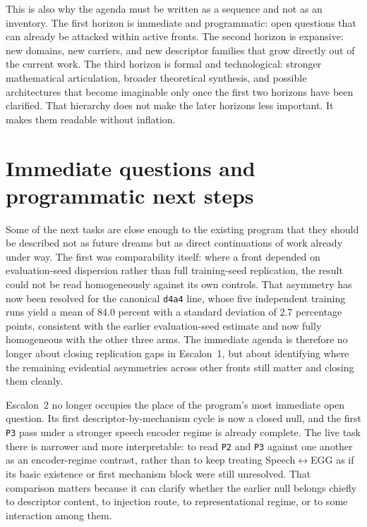 This is also why the agenda must be written as a sequence and not as an inventory. The first horizon is immediate and programmatic: open questions that can already be attacked within active fronts. The second horizon is expansive: new domains, new carriers, and new descriptor families that grow directly out of the current work. The third horizon is formal and technological: stronger mathematical articulation, broader theoretical synthesis, and possible architectures that become imaginable only once the first two horizons have been clarified. That hierarchy does not make the later horizons less important. It makes them readable without inflation.


\section{Immediate questions and programmatic next steps}


Some of the next tasks are close enough to the existing program that they should be described not as future dreams but as direct continuations of work already under way. The first was comparability itself: where a front depended on evaluation-seed dispersion rather than full training-seed replication, the result could not be read homogeneously against its own controls. That asymmetry has now been resolved for the canonical \texttt{d4a4} line, whose five independent training runs yield a mean of 84.0 percent with a standard deviation of 2.7 percentage points, consistent with the earlier evaluation-seed estimate and now fully homogeneous with the other three arms. The immediate agenda is therefore no longer about closing replication gaps in Escalon~1, but about identifying where the remaining evidential asymmetries across other fronts still matter and closing them cleanly.

Escalon~2 no longer occupies the place of the program's most immediate open question. Its first descriptor-by-mechanism cycle is now a closed null, and the first \texttt{P3} pass under a stronger speech encoder regime is already complete. The live task there is narrower and more interpretable: to read \texttt{P2} and \texttt{P3} against one another as an encoder-regime contrast, rather than to keep treating Speech$\leftrightarrow$EGG as if its basic existence or first mechanism block were still unresolved. That comparison matters because it can clarify whether the earlier null belongs chiefly to descriptor content, to injection route, to representational regime, or to some interaction among them.

